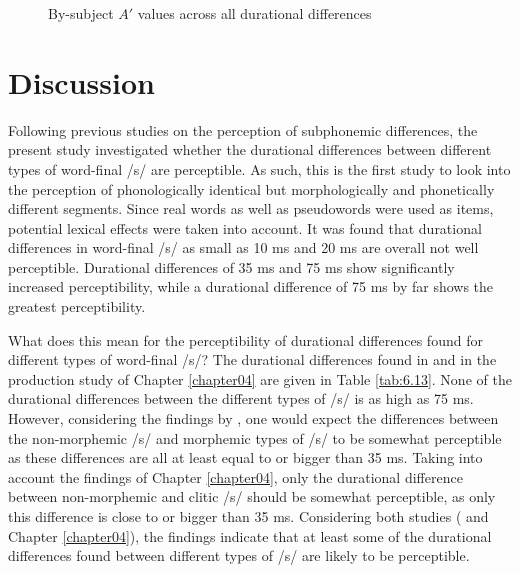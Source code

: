 \begin{figure}
    \centering
    
    \caption{By-subject $A'$ values across all durational differences}
    \label{fig:6_5}
\end{figure}

\section{Discussion}\label{section06_4}

Following previous studies on the perception of subphonemic differences, the present study investigated whether the durational differences between different types of word-final /s/ are perceptible. As such, this is the first study to look into the perception of phonologically identical but morphologically and phonetically different segments. Since real words as well as pseudowords were used as items, potential lexical effects were taken into account. It was found that durational differences in word-final /s/ as small as 10 ms and 20 ms are overall not well perceptible. Durational differences of 35 ms and 75 ms show significantly increased perceptibility, while a durational difference of 75 ms by far shows the greatest perceptibility.

What does this mean for the perceptibility of durational differences found for different types of word-final /s/? The durational differences found in \citet{Plag2017} and in the production study of Chapter \ref{chapter04} are given in Table \ref{tab:6.13}. None of the durational differences between the different types of /s/ is as high as 75 ms. However, considering the findings by \citet{Plag2017}, one would expect the differences between the non-morphemic /s/ and morphemic types of /s/ to be somewhat perceptible as these differences are all at least equal to or bigger than 35 ms. Taking into account the findings of Chapter \ref{chapter04}, only the durational difference between non-morphemic and clitic /s/ should be somewhat perceptible, as only this difference is close to or bigger than 35 ms. Considering both studies (\cite{Plag2017} and Chapter \ref{chapter04}), the findings indicate that at least some of the durational differences found between different types of /s/ are likely to be perceptible.

